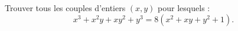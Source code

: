 Trouver tous les couples d'entiers $(x, y)$ pour lesquels :
\[
x^3 + x^2y + xy^2 + y^3 = 8(x^2 + xy + y^2 + 1).
\]
